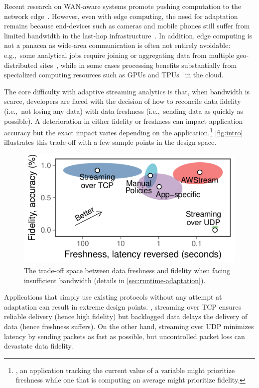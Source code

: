 Recent research on WAN-aware systems promote pushing computation to the network
edge~\cite{rabkin2014aggregation, satyanarayanan2009case}.  However, even with
edge computing, the need for adaptation remains because end-devices such as
cameras and mobile phones still suffer from limited bandwidth in the last-hop
infrastructure~\cite{abari2017enabling, zhang2015design}.  In addition, edge
computing is not a panacea as wide-area communication is often not entirely
avoidable: e.g.,~some analytical jobs require joining or aggregating data from
multiple geo-distributed sites~\cite{pu2015low, viswanathan2016clarinet}, while
in some cases processing benefits substantially from specialized computing
resources such as GPUs and TPUs~\cite{abadi2016tensorflow} in the cloud.

The core difficulty with adaptive streaming analytics is that, when bandwidth is
scarce, developers are faced with the decision of how to reconcile data fidelity
(i.e.,~not losing any data) with data freshness (i.e.,~sending data as quickly
as possible). A deterioration in either fidelity or freshness can impact
application accuracy but the exact impact varies depending on the
application.\footnote{, an application tracking the
  current value of a variable might prioritize freshness while one that is
  computing an average might prioritize fidelity.} \autoref{fig:intro}
illustrates this trade-off with a few sample points in the design space.

\begin{figure}
  \centering
  \includegraphics[width=0.8\columnwidth]{figures/figure1.pdf}
  \caption{The trade-off space between data freshness and fidelity when facing
    insufficient bandwidth (details in \autoref{sec:runtime-adaptation}).}
  \label{fig:intro}
  \vspace{-1em}
\end{figure}

Applications that simply use existing protocols without any attempt at
adaptation can result in extreme design points. , streaming over TCP ensures
reliable delivery (hence high fidelity) but backlogged data delays the delivery
of data (hence freshness suffers).  On the other hand, streaming over UDP
minimizes latency by sending packets as fast as possible, but uncontrolled
packet loss can devastate data fidelity.

